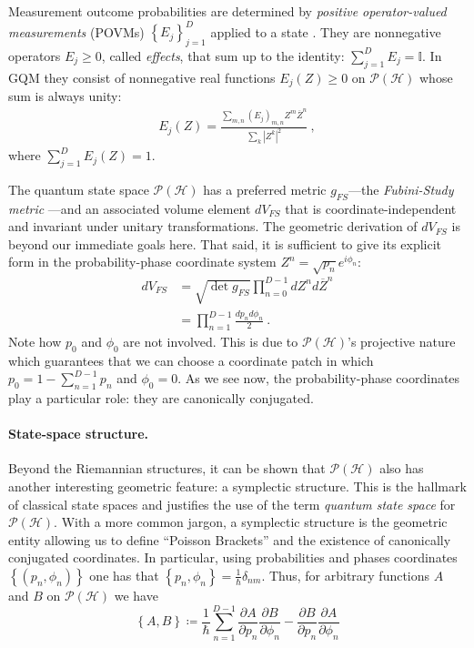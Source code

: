 \documentclass[draft,nofootinbib,pre,twocolumn,showpacs,showkeys,preprintnumbers,floatfix]{revtex4-1}
\newcommand{\1}{\mathbbm{1}}
\newcommand{\PH}{\mathcal{P}(\mathcal{H})}
\begin{document}
Measurement outcome probabilities are determined by \emph{positive
operator-valued measurements} (POVMs) $\left\{E_j\right\}_{j=1}^D$ applied to a
state \cite{Nielsen2010,Heinosaari2012}. They are nonnegative operators
$E_j\geq 0$, called \emph{effects}, that sum up to the identity: $\sum_{j=1}^{D}
E_j = \mathbb{I}$. In GQM they consist of nonnegative real functions $E_j(Z)\ge
0$ on $\mathcal{P}(\mathcal{H})$ whose sum is always unity:
\begin{align}
E_j(Z) = \frac{\sum_{m,n}
  \left(E_j\right)_{m,n} Z^m \overline{Z}^n}{\sum_{k} \left\vert Z^k \right\vert^2}
  ~,
\label{eq:GQM_POVMs}
\end{align}
where $\sum_{j=1}^{D}E_j(Z) = 1$.

The quantum state space $\mathcal{P}(\mathcal{H})$ has a preferred metric 
$g_{FS}$---the \emph{Fubini-Study metric} \cite{Bengtsson2017}---and an 
associated volume element $dV_{FS}$ that is coordinate-independent and
invariant under unitary transformations. The geometric derivation of $dV_{FS}$
is beyond our immediate goals here. That said, it is sufficient to give its
explicit form in the probability-phase coordinate system $Z^n =
\sqrt{p_n}e^{i\phi_n}$:
\begin{align*}
dV_{FS}
  & = \sqrt{\det g_{FS}}
  \prod_{n=0}^{D-1} dZ^n d\overline{Z}^n \\
  & =  \prod_{n=1}^{D-1} \frac{dp_n d\phi_n}{2}
  ~.
\end{align*}
Note how $p_0$ and $\phi_0$ are not involved. This is due to
$\mathcal{P}(\mathcal{H})$'s projective nature which guarantees that we can
choose a coordinate patch in which $p_0 = 1 - \sum_{n=1}^{D-1}p_n$
and $\phi_0 = 0$. As we see now, the probability-phase coordinates play a 
particular role: they are canonically conjugated.

\paragraph*{State-space structure.} Beyond the Riemannian structures, it can 
be shown that $\PH$ also has another interesting geometric feature: a symplectic structure.
This is the hallmark of classical state spaces and justifies the use of the term 
\emph{quantum state space} for $\PH$. With a more common jargon, a symplectic
structure is the geometric entity allowing us to define ``Poisson Brackets''
and the existence of canonically conjugated coordinates. In particular, using 
probabilities and phases coordinates $\left\{ (p_n,\phi_n)\right\}$
one has that $\left\{ p_n , \phi_n \right\} = \frac{1}{\hbar}\delta_{nm}$. Thus,
for arbitrary functions $A$ and $B$ on $\PH$ we have
\begin{equation}
\left\{ A, B\right\} \coloneqq \frac{1}{\hbar}\sum_{n=1}^{D-1} \frac{\partial A}{\partial p_n} \frac{\partial B}{\partial \phi_n} - \frac{\partial B}{\partial p_n} \frac{\partial A}{\partial \phi_n}
\end{equation}
\end{document}
